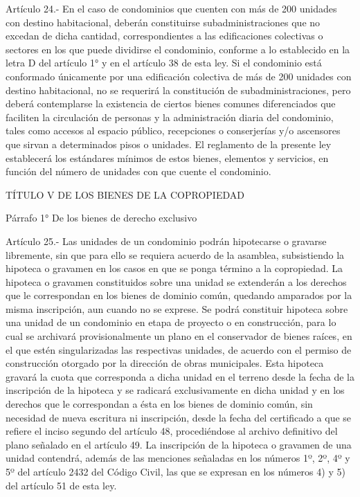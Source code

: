     Artículo 24.- En el caso de condominios que cuenten con más de 200 unidades con destino habitacional, deberán constituirse subadministraciones que no excedan de dicha cantidad, correspondientes a las edificaciones colectivas o sectores en los que puede dividirse el condominio, conforme a lo establecido en la letra D del artículo 1° y en el artículo 38 de esta ley.
    Si el condominio está conformado únicamente por una edificación colectiva de más de 200 unidades con destino habitacional, no se requerirá la constitución de subadministraciones, pero deberá contemplarse la existencia de ciertos bienes comunes diferenciados que faciliten la circulación de personas y la administración diaria del condominio, tales como accesos al espacio público, recepciones o conserjerías y/o ascensores que sirvan a determinados pisos o unidades. El reglamento de la presente ley establecerá los estándares mínimos de estos bienes, elementos y servicios, en función del número de unidades con que cuente el condominio.

    TÍTULO V
    DE LOS BIENES DE LA COPROPIEDAD


    Párrafo 1°
    De los bienes de derecho exclusivo

     
    Artículo 25.- Las unidades de un condominio podrán hipotecarse o gravarse libremente, sin que para ello se requiera acuerdo de la asamblea, subsistiendo la hipoteca o gravamen en los casos en que se ponga término a la copropiedad.
    La hipoteca o gravamen constituidos sobre una unidad se extenderán a los derechos que le correspondan en los bienes de dominio común, quedando amparados por la misma inscripción, aun cuando no se exprese.
    Se podrá constituir hipoteca sobre una unidad de un condominio en etapa de proyecto o en construcción, para lo cual se archivará provisionalmente un plano en el conservador de bienes raíces, en el que estén singularizadas las respectivas unidades, de acuerdo con el permiso de construcción otorgado por la dirección de obras municipales. Esta hipoteca gravará la cuota que corresponda a dicha unidad en el terreno desde la fecha de la inscripción de la hipoteca y se radicará exclusivamente en dicha unidad y en los derechos que le correspondan a ésta en los bienes de dominio común, sin necesidad de nueva escritura ni inscripción, desde la fecha del certificado a que se refiere el inciso segundo del artículo 48, procediéndose al archivo definitivo del plano señalado en el artículo 49.
    La inscripción de la hipoteca o gravamen de una unidad contendrá, además de las menciones señaladas en los números 1º, 2º, 4º y 5º del artículo 2432 del Código Civil, las que se expresan en los números 4) y 5) del artículo 51 de esta ley.
     
